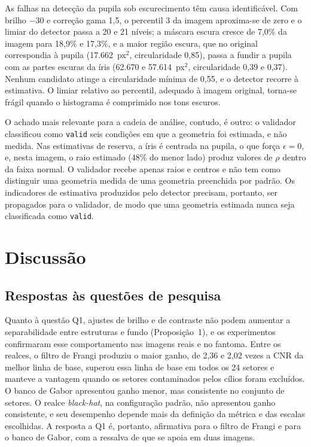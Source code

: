 \documentclass[12pt, oneside, a4paper, chapter=TITLE, section=TITLE,
               english, brazil]{abntex2}
\newcommand{\secao}[1]{\section[\texorpdfstring{\protect\MakeTextUppercase{#1}}{#1}]{#1}}
\newcommand{\bh}{\emph{black-hat}}
\begin{document}
As falhas na detecção da pupila sob escurecimento têm causa identificável.
Com brilho $-30$ e correção gama 1,5, o percentil 3 da imagem aproxima-se de
zero e o limiar do detector passa a 20 e 21 níveis; a máscara escura cresce de
7,0\% da imagem para 18,9\% e 17,3\%, e a maior região escura, que no original
correspondia à pupila (17.662~px$^2$, circularidade 0,85), passa a fundir a
pupila com as partes escuras da íris (62.670 e 57.614~px$^2$, circularidade
0,39 e 0,37). Nenhum candidato atinge a circularidade mínima de 0,55, e o
detector recorre à estimativa. O limiar relativo ao percentil, adequado à
imagem original, torna-se frágil quando o histograma é comprimido nos tons
escuros.

O achado mais relevante para a cadeia de análise, contudo, é outro: o
validador classificou como \texttt{valid} seis condições em que a geometria
foi estimada, e não medida. Nas estimativas de reserva, a íris é centrada na
pupila, o que força $\epsilon = 0$, e, nesta imagem, o raio estimado (48\% do
menor lado) produz valores de $\rho$ dentro da faixa normal. O validador
recebe apenas raios e centros e não tem como distinguir uma geometria medida
de uma geometria preenchida por padrão. Os indicadores de estimativa
produzidos pelo detector precisam, portanto, ser propagados para o validador,
de modo que uma geometria estimada nunca seja classificada como
\texttt{valid}.

\chapter{Discussão}
\label{cap:discussao}

\secao{Respostas às questões de pesquisa}
\label{sec:respostas}

Quanto à questão Q1, ajustes de brilho e de contraste não podem aumentar a
separabilidade entre estruturas e fundo (Proposição~1), e os experimentos
confirmaram esse comportamento nas imagens reais e no fantoma. Entre os
realces, o filtro de Frangi produziu o maior ganho, de 2,36 e 2,02 vezes a CNR
da melhor linha de base, superou essa linha de base em todos os 24 setores e
manteve a vantagem quando os setores contaminados pelos cílios foram
excluídos. O banco de Gabor apresentou ganho menor, mas consistente no
conjunto de setores. O realce \bh{}, na configuração padrão, não apresentou
ganho consistente, e seu desempenho depende mais da definição da métrica e das
escalas escolhidas. A resposta a Q1 é, portanto, afirmativa para o filtro de
Frangi e para o banco de Gabor, com a ressalva de que se apoia em duas
imagens.
\end{document}
